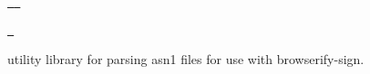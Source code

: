 \href{http://travis-ci.org/crypto-browserify/parse-asn1}{\texttt{ }} \href{https://www.npmjs.org/package/parse-asn1}{\texttt{ }}

\href{https://github.com/feross/standard}{\texttt{ }}

utility library for parsing asn1 files for use with browserify-\/sign. 
